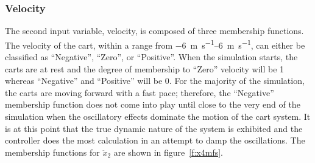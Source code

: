 \documentclass[submit]{aiaa-tc}%
\begin{document}
\subsubsection{Velocity}
The second input variable, velocity, is composed of three membership functions. The velocity of the cart, within a range from \SIrange{-6}{6}{\metre\per\second}, can either be classified as ``Negative'', ``Zero'', or ``Positive''. When the simulation starts, the carts are at rest and the degree of membership to ``Zero'' velocity will be 1 whereas ``Negative'' and ``Positive'' will be 0. For the majority of the simulation, the carts are moving forward with a fast pace; therefore, the ``Negative'' membership function does not come into play until close to the very end of the  simulation when the oscillatory effects dominate the motion of the cart system. It is at this point that the true dynamic nature of the system is exhibited and the controller does the most calculation in an attempt to damp the oscillations. The membership functions for $\ddot{x}_2$ are shown in figure~\vref{f:x4mfs}. 
\end{document}
